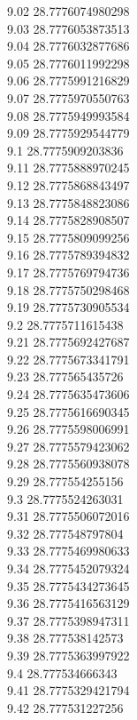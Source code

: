 {9.02	28.7776074980298\\
9.03	28.7776053873513\\
9.04	28.7776032877686\\
9.05	28.7776011992298\\
9.06	28.7775991216829\\
9.07	28.7775970550763\\
9.08	28.7775949993584\\
9.09	28.7775929544779\\
9.1	28.7775909203836\\
9.11	28.7775888970245\\
9.12	28.7775868843497\\
9.13	28.7775848823086\\
9.14	28.7775828908507\\
9.15	28.7775809099256\\
9.16	28.7775789394832\\
9.17	28.7775769794736\\
9.18	28.7775750298468\\
9.19	28.7775730905534\\
9.2	28.7775711615438\\
9.21	28.7775692427687\\
9.22	28.7775673341791\\
9.23	28.777565435726\\
9.24	28.7775635473606\\
9.25	28.7775616690345\\
9.26	28.7775598006991\\
9.27	28.7775579423062\\
9.28	28.7775560938078\\
9.29	28.777554255156\\
9.3	28.7775524263031\\
9.31	28.7775506072016\\
9.32	28.777548797804\\
9.33	28.7775469980633\\
9.34	28.7775452079324\\
9.35	28.7775434273645\\
9.36	28.7775416563129\\
9.37	28.7775398947311\\
9.38	28.777538142573\\
9.39	28.7775363997922\\
9.4	28.777534666343\\
9.41	28.7775329421794\\
9.42	28.777531227256\\
}
